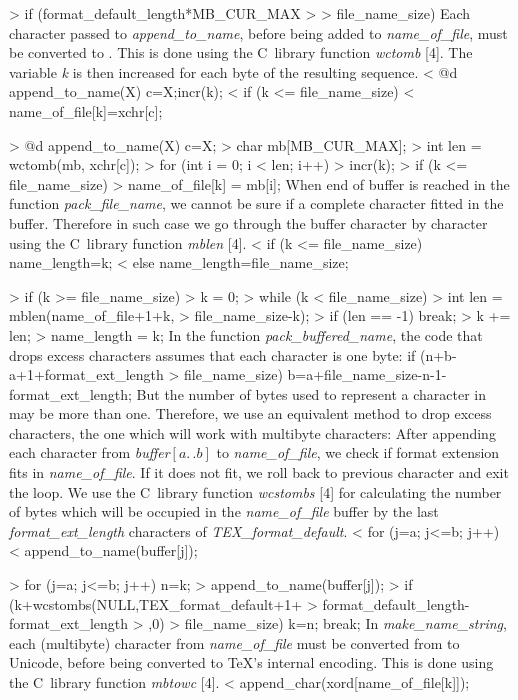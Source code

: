 > if (format_default_length*MB_CUR_MAX >
>     file_name_size)
\endverbatim
\medskip
Each character passed to {\it append\_to\_name\/},
before being added to {\it name\_of\_file\/},
must
be converted to \hbox{}. This is done using
the C~library function {\it wctomb\/} [4].
The variable {\it k\/} is then increased for each
byte of the resulting \hbox{} sequence.
\verbatim
< @d append_to_name(X) { c=X;incr(k);
<   if (k <= file_name_size)
<     name_of_file[k]=xchr[c]; }

> @d append_to_name(X) { c=X;
>   char mb[MB_CUR_MAX];
>   int len = wctomb(mb, xchr[c]);
>   for (int i = 0; i < len; i++) {
>     incr(k);
>     if (k <= file_name_size)
>       name_of_file[k] = mb[i]; } }
\endverbatim
\medskip
When end of buffer is reached in the function {\it pack\_file\_name\/},
we cannot be sure if a
complete character fitted in the buffer.
Therefore in such case we go through the buffer character
by character using the C~library
function {\it mblen\/} [4].
\verbatim
< if (k <= file_name_size) name_length=k;
< else name_length=file_name_size;

> if (k >= file_name_size) {
>   k = 0;
>   while (k < file_name_size) {
>     int len = mblen(name_of_file+1+k,
>       file_name_size-k);
>     if (len == -1) break;
>     k += len; } }
> name_length = k;
\endverbatim
\medskip
In the function {\it pack\_buffered\_name\/},
the code that drops excess characters
assumes that each character is one byte:
\verbatim
if (n+b-a+1+format_ext_length >
    file_name_size)
  b=a+file_name_size-n-1-format_ext_length;
\endverbatim
But the number of bytes used to represent
a character in \hbox{} may be more than one.
Therefore, we use an equivalent method to drop excess
characters, the one which will work with multibyte characters:
After appending
each character from
\hbox{\it buffer\/$[a\mathrel{.\,.}b]$\/}
to {\it name\_of\_file\/}, we check if
format extension fits in {\it name\_of\_file\/}.
If it does not fit, we roll back to previous
character and exit the loop.
We use the C~library function {\it wcstombs\/} [4] for
calculating the number of bytes which will be occupied in
the {\it name\_of\_file\/} buffer by the last
{\it format\_ext\_length\/} characters
of {\it TEX\_format\_default\/}.
\verbatim
< for (j=a; j<=b; j++)
<   append_to_name(buffer[j]);

> for (j=a; j<=b; j++) { n=k;
>   append_to_name(buffer[j]);
>   if (k+wcstombs(NULL,TEX_format_default+1+
>     format_default_length-format_ext_length
>     ,0) > file_name_size) { k=n; break; } }
\endverbatim
\medskip
In {\it make\_name\_string\/},
each (multibyte) character from {\it name\_of\_file\/}
must be converted from  to Unicode,
before being converted to \TeX's internal encoding.
This is done using the C~library function
{\it mbtowc\/} [4].
\verbatim
< append_char(xord[name_of_file[k]]);

